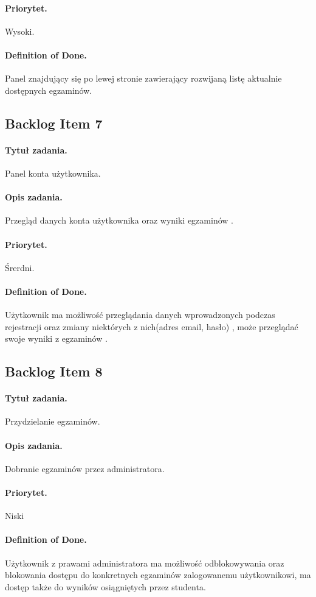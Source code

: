 \documentclass[a4paper]{article}
\begin{document}
\paragraph{Priorytet.} Wysoki.
\paragraph{Definition of Done.} Panel znajdujący się po lewej stronie zawierający rozwijaną listę aktualnie dostępnych egzaminów.

\subsection{Backlog Item 7}
\paragraph{Tytuł zadania.} Panel konta użytkownika.
\paragraph{Opis zadania.} Przegląd danych konta użytkownika oraz wyniki egzaminów .
\paragraph{Priorytet.} Śrerdni.
\paragraph{Definition of Done.} Użytkownik ma możliwość przeglądania danych wprowadzonych podczas rejestracji oraz zmiany niektórych z nich(adres email, hasło) , może przeglądać swoje wyniki z egzaminów .

\subsection{Backlog Item 8}
\paragraph{Tytuł zadania.} Przydzielanie egzaminów.
\paragraph{Opis zadania.} Dobranie egzaminów przez administratora.
\paragraph{Priorytet.} Niski
\paragraph{Definition of Done.} Użytkownik z prawami administratora ma możliwość odblokowywania oraz blokowania dostępu do konkretnych egzaminów zalogowanemu użytkownikowi, ma dostęp także do wyników osiągniętych przez studenta.
\end{document}
